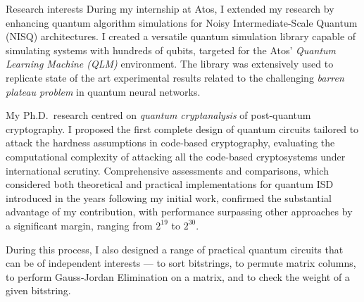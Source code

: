 \documentclass[
	a4paper, %
	10pt, %
]{tresume} %
\begin{document}
\begin{tSection}{Research interests}
  During my internship at Atos, I extended my research by enhancing quantum
  algorithm simulations for Noisy Intermediate-Scale Quantum (NISQ)
  architectures. I created a versatile quantum simulation library capable of
  simulating systems with hundreds of qubits, targeted for the Atos'
  \emph{Quantum Learning Machine (QLM)} environment. The library was extensively
  used to replicate state of the art experimental results related to the
  challenging \emph{barren plateau problem} in quantum neural networks.

  My Ph.D.\ research centred on \emph{quantum cryptanalysis} of post-quantum
  cryptography. I proposed the first complete design of quantum circuits
  tailored to attack the hardness assumptions in code-based cryptography,
  evaluating the computational complexity of attacking all the code-based
  cryptosystems under international scrutiny.
  Comprehensive assessments and comparisons, which considered both theoretical
  and practical implementations for quantum ISD introduced in the years
  following my initial work, confirmed the substantial advantage of my
  contribution, with performance surpassing other approaches by a significant
  margin, ranging from $2^{19}$ to $2^{30}$.

  During this process, I also designed a range of practical quantum circuits
  that can be of independent interests --- to sort bitstrings, to permute matrix
  columns, to perform Gauss-Jordan Elimination on a matrix, and to check the
  weight of a given bitstring.

\end{tSection}
\clearpage
\end{document}
